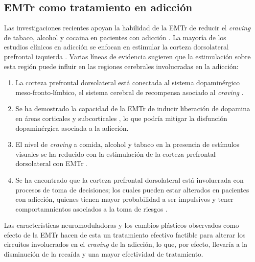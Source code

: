 \subsection{EMTr como tratamiento en adicción}
Las investigaciones recientes apoyan la habilidad de la EMTr de reducir el \textit{craving} de tabaco, alcohol y cocaina en pacientes con adicción \parencite{Barr2011}.
La mayoría de los estudios clínicos en adicción se enfocan en estimular la corteza dorsolateral prefrontal izquierda \parencite{Bellamoli2014a,Barr2011,Ekhtiari2019}.
Varias líneas de evidencia sugieren que la estimulación sobre esta región puede influir en las regiones cerebrales involucradas en la adicción:
\begin{enumerate}
    \item La corteza prefrontal dorsolateral está conectada al sistema dopaminérgico meso-fronto-límbico, el sistema cerebral de recompensa asociado al \textit{craving} \parencite{Barr2011}.
    \item Se ha demostrado la capacidad de la EMTr de inducir liberación de dopamina en áreas corticales y subcorticales \parencite{Cho2009,Strafella2001}, lo que podría mitigar la disfunción dopaminérgica asociada a la adicción.
    \item El nivel de \textit{craving} a comida, alcohol y tabaco en la presencia de estímulos visuales se ha reducido con la estimulación de la corteza prefrontal dorsolateral con EMTr \parencite{Amiaz2009}.
    \item Se ha encontrado que la corteza prefrontal dorsolateral está involucrada con procesos de toma de decisiones; los cuales pueden estar alterados en pacientes con adicción, quienes tienen mayor probabilidad a ser impulsivos y tener comportamnientos asociados a la toma de riesgos \parencite{Barr2011}.
\end{enumerate}
Las características neuromoduladoras y los cambios plásticos observados como efecto de la EMTr hacen de esta un tratamiento efectivo factible para alterar los circuitos involucrados en el \textit{craving} de la adicción, lo que, por efecto, llevaría a la disminución de la recaída y una mayor efectividad de tratamiento.

